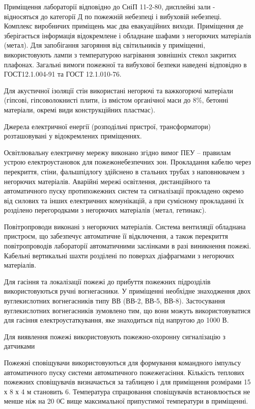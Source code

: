 \documentclass[ukrainian,utf8,simple,floatsingle,hpadding=5mm]{eskdtext}
\begin{document}
Приміщення лабораторії відповідно до СніП 11-2-80, дисплейні зали - відносяться до категорії Д 
по пожежній небезпеці і вибуховій небезпеці. Комплекс виробничих приміщень має два евакуаційних виходи.
Приміщення де зберігається інформація відокремлене і  обладнане шафами з негорючих матеріалів (метал).
Для запобігання загоряння від світильників у приміщенні, використовують лампи з температурою нагрівання зовнішніх стекол закритих плафонах.
Загальні вимоги пожежної та вибухової безпеки наведені відповідно в ГОСТ12.1.004-91 та ГОСТ 12.1.010-76.

Для акустичної ізоляції стін використані негорючі та важкогорючі матеріали (гіпсові, гіпсоволокнисті 
плити, із вмістом органічної маси до 8\%, бетонні матеріали, окремі види конструкційних пластмас).

Джерела електричної енергії (розподільчі пристрої, трансформатори) розташовувані у відокремлених приміщеннях.

Освітлювальну електричну мережу виконано згідно вимог ПЕУ – правилам устрою електроустановок для пожежонебезпечних зон.
Прокладання кабелю через перекриття, стіни, фальшпідлогу здійснено в стальних трубах з наповнювачем з негорючих матеріалів.
Аварійні мережі освітлення, дистанційного та автоматичного пуску протипожежних систем та сигналізації 
прокладено окремо від силових та інших електричних комунікацій, а при сумісному прокладанні їх 
розділено перегородками з негорючих матеріалів (метал, гетинакс).



Повітропроводи виконані з негорючих матеріалів. Система вентиляції обладнана пристроєм, що 
забезпечує автоматичне її відключення, а також перекриття повітропроводів лабораторії 
автоматичними заслінками в разі виникнення пожежі. Кабельні вертикальні шахти розділені 
по поверхах діафрагмами з негорючих матеріалів.

Для гасіння та локалізації пожежі до прибуття пожежних підрозділів використовуються 
ручні вогнегасники.  У приміщенні необхідне знаходження двох вуглекислотних вогнегасників 
типу ВВ (ВВ-2, ВВ-5, ВВ-8). Застосування вуглекислотних вогнегасників зумовлено тим, що 
вони можуть використовуватися для гасіння електроустаткування, яке знаходиться під напругою до 1000 В. 

Для виявлення пожежі використовують пожежно-охоронну сигналізацію з датчиками 

Пожежні сповіщувачи використовуються для формування командного імпульсу автоматичного 
пуску системи автоматичного пожежегасіння. Кількість теплових пожежних сповіщувачів 
визначається за таблицею і для приміщення розмірами 15 х 8 х 4 м становить 6. 
Температура спрацювання сповіщувачів встановлюється не менше ніж на 20 0С вище 
максимальної припустимої температури в приміщенні.
\end{document}
